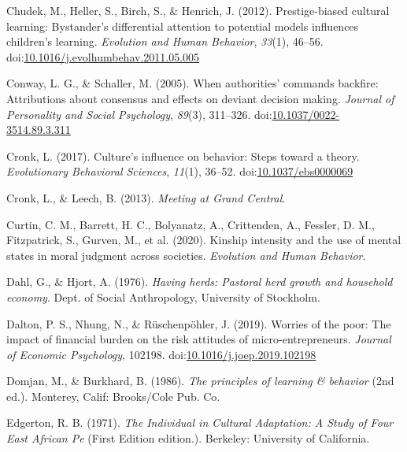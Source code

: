 \documentclass[
  11pt,
]{article}
\begin{document}
\leavevmode\hypertarget{ref-chudekPrestigebiasedCulturalLearning2012a}{}%
Chudek, M., Heller, S., Birch, S., \& Henrich, J. (2012).
Prestige-biased cultural learning: Bystander's differential attention to
potential models influences children's learning. \emph{Evolution and
Human Behavior}, \emph{33}(1), 46--56.
doi:\href{https://doi.org/10.1016/j.evolhumbehav.2011.05.005}{10.1016/j.evolhumbehav.2011.05.005}

\leavevmode\hypertarget{ref-conwayiiiWhenAuthoritiesCommands2005}{}%
Conway, L. G., \& Schaller, M. (2005). When authorities' commands
backfire: Attributions about consensus and effects on deviant decision
making. \emph{Journal of Personality and Social Psychology},
\emph{89}(3), 311--326.
doi:\href{https://doi.org/10.1037/0022-3514.89.3.311}{10.1037/0022-3514.89.3.311}

\leavevmode\hypertarget{ref-cronkCultureInfluenceBehavior2017a}{}%
Cronk, L. (2017). Culture's influence on behavior: Steps toward a
theory. \emph{Evolutionary Behavioral Sciences}, \emph{11}(1), 36--52.
doi:\href{https://doi.org/10.1037/ebs0000069}{10.1037/ebs0000069}

\leavevmode\hypertarget{ref-cronkMeetingGrandCentral2012}{}%
Cronk, L., \& Leech, B. (2013). \emph{Meeting at Grand Central}.

\leavevmode\hypertarget{ref-curtin2020kinship}{}%
Curtin, C. M., Barrett, H. C., Bolyanatz, A., Crittenden, A., Fessler,
D. M., Fitzpatrick, S., Gurven, M., et al. (2020). Kinship intensity and
the use of mental states in moral judgment across societies.
\emph{Evolution and Human Behavior}.

\leavevmode\hypertarget{ref-dahlHavingHerdsPastoral1976}{}%
Dahl, G., \& Hjort, A. (1976). \emph{Having herds: Pastoral herd growth
and household economy}. Dept. of Social Anthropology, University of
Stockholm.

\leavevmode\hypertarget{ref-daltonWorriesPoorImpact2019}{}%
Dalton, P. S., Nhung, N., \& Rüschenpöhler, J. (2019). Worries of the
poor: The impact of financial burden on the risk attitudes of
micro-entrepreneurs. \emph{Journal of Economic Psychology}, 102198.
doi:\href{https://doi.org/10.1016/j.joep.2019.102198}{10.1016/j.joep.2019.102198}

\leavevmode\hypertarget{ref-domjanPrinciplesLearningBehavior1986}{}%
Domjan, M., \& Burkhard, B. (1986). \emph{The principles of learning \&
behavior} (2nd ed.). Monterey, Calif: Brooks/Cole Pub. Co.

\leavevmode\hypertarget{ref-edgertonIndividualCulturalAdaptation1971}{}%
Edgerton, R. B. (1971). \emph{The Individual in Cultural Adaptation: A
Study of Four East African Pe} (First Edition edition.). Berkeley:
University of California.
\end{document}
